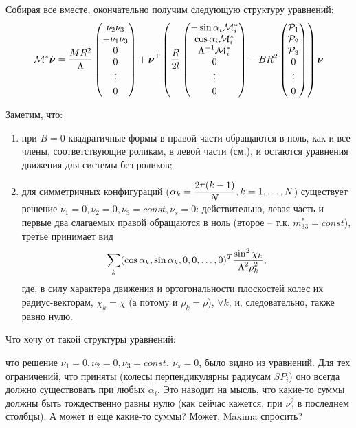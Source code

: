 Собирая все вместе, окончательно получим следующую структуру уравнений:
\begin{eqnarray}\label{eq:full_system}
\M^*\dot{\vec{\nu}} = 
\frac{MR^2}{\Lambda}\left(\begin{matrix}
    \nu_2\nu_3\\
    -\nu_1\nu_3\\
    0\\
    0\\
    \vdots
    \\
    0
\end{matrix}\right)
+\vec{\nu}^\mathrm{T}\left(
\frac{R}{2l}
\left(\begin{matrix}
    -\sin\alpha_i \M^*_i\\
    \cos\alpha_i \M^*_i\\
    \Lambda^{-1}\M^*_i\\
    0\\
    \vdots
    \\
    0
    \end{matrix}
\right)
-BR^2
\left(\begin{matrix}
    \Prhs_1\\
    \Prhs_2\\
    \Prhs_3\\
    0\\
    \vdots
    \\
    0
\end{matrix}\right)
\right)
\vec{\nu}
\end{eqnarray}

Заметим, что:
\begin{enumerate}
    \item при $B = 0$ квадратичные формы в правой части обращаются в ноль, как и все члены, соответствующие роликам, в левой части (см.), и остаются уравнения движения для системы без роликов;

    \item для симметричных конфигураций ($\alpha_k = \displaystyle\frac{\displaystyle 2\pi (k-1)}{\displaystyle N}, k = 1,\ldots,N$) существует решение $\nu_1= 0, \nu_2 = 0, \nu_3 = const, \nu_s = 0$: действительно, левая часть и первые два слагаемых правой обращаются в ноль (второе -- т.к. $m^*_{33} = const$), третье принимает вид
    $$\sum_{k}(\cos\alpha_k, \sin\alpha_k, 0, 0, \ldots, 0)^T\displaystyle\frac{\displaystyle \sin^2\chi_k}{\displaystyle \Lambda^2\rho^2_k},$$
    где, в силу характера движения и ортогональности плоскостей колес их радиус-векторам, $\chi_k = \chi$ (а потому и $\rho_k = \rho$), $\forall k$, и, следовательно, также равно нулю.

\end{enumerate}


Что хочу от такой структуры уравнений:

что решение $\nu_1= 0, \nu_2 = 0, \nu_3 = const,\ \nu_s = 0$, было видно из уравнений. Для тех ограничений, что приняты (колесы перпендикулярны радиусам $SP_i$) оно всегда должно существовать при любых $\alpha_i$. Это наводит на мысль, что какие-то суммы должны быть тождественно равны нулю (как сейчас кажется, при $\nu_3^2$ в последнем столбцы). А может и еще какие-то суммы? Может, Maxima спросить?
